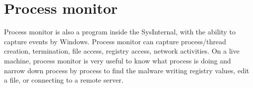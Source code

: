 \section[Process monitor]{Process monitor}

Process monitor is also a program inside the SysInternal, with the ability to
capture events by Windows. Process monitor can capture process/thread creation,
termination, file access, registry access, network activities. On a live
machine, process monitor is very useful to know what process is doing and
narrow down process by process to find the malware writing registry values,
edit a file, or connecting to a remote server.
